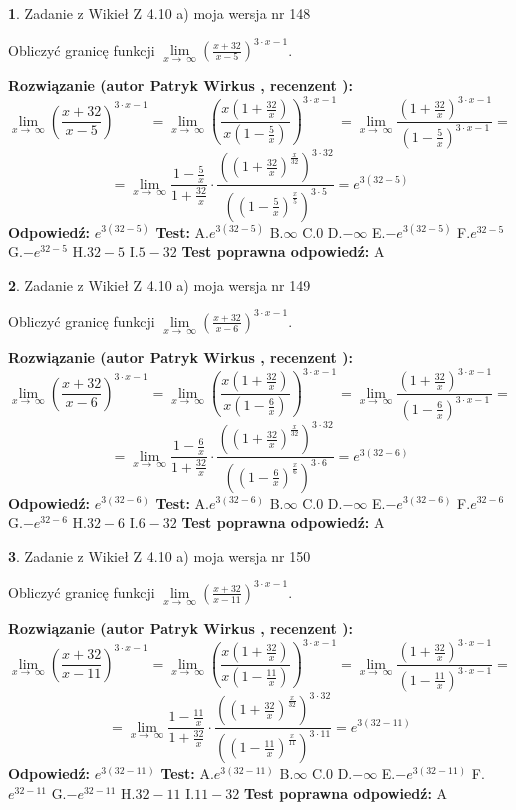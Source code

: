 \documentclass[12pt, a4paper]{article}
\theoremstyle{definition} %
\newtheorem{zad}{}
\newcommand{\zadStart}[1]{\begin{zad}#1\newline}
\newcommand{\zadStop}{\end{zad}}
\newcommand{\rozwStart}[2]{\noindent \textbf{Rozwiązanie (autor #1 , recenzent #2): }\newline}
\newcommand{\rozwStop}{\newline}
\newcommand{\odpStart}{\noindent \textbf{Odpowiedź:}\newline}
\newcommand{\odpStop}{\newline}
\newcommand{\testStart}{\noindent \textbf{Test:}\newline}
\newcommand{\testStop}{\newline}
\newcommand{\kluczStart}{\noindent \textbf{Test poprawna odpowiedź:}\newline}
\newcommand{\kluczStop}{\newline}
\begin{document}
\zadStart{Zadanie z Wikieł Z 4.10 a) moja wersja nr 148}


Obliczyć granicę funkcji  $\lim\limits_{x\to\ \infty}(\frac{x+32}{x-5})^{3\cdot x-1}$.
\zadStop
\rozwStart{Patryk Wirkus}{}
$$\lim\limits_{x\to\ \infty}(\frac{x+32}{x-5})^{3\cdot x-1} = \lim\limits_{x\to\ \infty}(\frac{x(1+\frac{32}{x})}{x(1-\frac{5}{x})})^{3\cdot x-1}=\lim\limits_{x\to\ \infty}\frac{(1+\frac{32}{x})^{3\cdot x-1}}{(1-\frac{5}{x})^{3\cdot x-1}}=$$
$$=\lim\limits_{x\to\ \infty}\frac{1-\frac{5}{x}}{1+\frac{32}{x}}\cdot\frac{((1+\frac{32}{x})^{\frac{x}{32}})^{3\cdot32}}{((1-\frac{5}{x})^{\frac{x}{5}})^{3\cdot5}}=e^{3(32-5)}$$
\rozwStop
\odpStart
$e^{3(32-5)}$
\odpStop
\testStart
A.$e^{3(32-5)}$ B.$\infty$ C.$0$ D.$-\infty$ E.$-e^{3(32-5)}$
F.$e^{32-5}$ G.$-e^{32-5}$
H.$32-5$
I.$5-32$
\testStop
\kluczStart
A
\kluczStop



\zadStart{Zadanie z Wikieł Z 4.10 a) moja wersja nr 149}


Obliczyć granicę funkcji  $\lim\limits_{x\to\ \infty}(\frac{x+32}{x-6})^{3\cdot x-1}$.
\zadStop
\rozwStart{Patryk Wirkus}{}
$$\lim\limits_{x\to\ \infty}(\frac{x+32}{x-6})^{3\cdot x-1} = \lim\limits_{x\to\ \infty}(\frac{x(1+\frac{32}{x})}{x(1-\frac{6}{x})})^{3\cdot x-1}=\lim\limits_{x\to\ \infty}\frac{(1+\frac{32}{x})^{3\cdot x-1}}{(1-\frac{6}{x})^{3\cdot x-1}}=$$
$$=\lim\limits_{x\to\ \infty}\frac{1-\frac{6}{x}}{1+\frac{32}{x}}\cdot\frac{((1+\frac{32}{x})^{\frac{x}{32}})^{3\cdot32}}{((1-\frac{6}{x})^{\frac{x}{6}})^{3\cdot6}}=e^{3(32-6)}$$
\rozwStop
\odpStart
$e^{3(32-6)}$
\odpStop
\testStart
A.$e^{3(32-6)}$ B.$\infty$ C.$0$ D.$-\infty$ E.$-e^{3(32-6)}$
F.$e^{32-6}$ G.$-e^{32-6}$
H.$32-6$
I.$6-32$
\testStop
\kluczStart
A
\kluczStop



\zadStart{Zadanie z Wikieł Z 4.10 a) moja wersja nr 150}


Obliczyć granicę funkcji  $\lim\limits_{x\to\ \infty}(\frac{x+32}{x-11})^{3\cdot x-1}$.
\zadStop
\rozwStart{Patryk Wirkus}{}
$$\lim\limits_{x\to\ \infty}(\frac{x+32}{x-11})^{3\cdot x-1} = \lim\limits_{x\to\ \infty}(\frac{x(1+\frac{32}{x})}{x(1-\frac{11}{x})})^{3\cdot x-1}=\lim\limits_{x\to\ \infty}\frac{(1+\frac{32}{x})^{3\cdot x-1}}{(1-\frac{11}{x})^{3\cdot x-1}}=$$
$$=\lim\limits_{x\to\ \infty}\frac{1-\frac{11}{x}}{1+\frac{32}{x}}\cdot\frac{((1+\frac{32}{x})^{\frac{x}{32}})^{3\cdot32}}{((1-\frac{11}{x})^{\frac{x}{11}})^{3\cdot11}}=e^{3(32-11)}$$
\rozwStop
\odpStart
$e^{3(32-11)}$
\odpStop
\testStart
A.$e^{3(32-11)}$ B.$\infty$ C.$0$ D.$-\infty$ E.$-e^{3(32-11)}$
F.$e^{32-11}$ G.$-e^{32-11}$
H.$32-11$
I.$11-32$
\testStop
\kluczStart
A
\kluczStop
\end{document}
